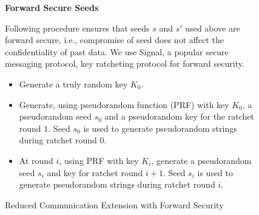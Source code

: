 \begin{figure*}[h]
\begin{mdframed}[style=myframe]
\textbf{Forward Secure Seeds}
\vspace{4pt}

Following procedure ensures that seeds $s$ and $s'$ used above are forward
	secure, i.e., compromise of seed does not affect the confidentiality of past
	data. We use Signal, a popular secure messaging protocol, key ratcheting
	protocol for forward security.

\begin{itemize}[leftmargin=*,itemsep=4pt,topsep=4pt]

	\item Generate a truly random key $K_0$.

	\item Generate, using pseudorandom function (PRF) with key $K_0$, a
		pseudorandom seed $s_0$ and a pseudorandom key for the ratchet round $1$.
		Seed $s_0$ is used to generate pseudorandom strings during ratchet round
		$0$.

	\item At round $i$, using PRF with key $K_i$, generate a pseudorandom seed
		$s_i$ and key for ratchet round $i+1$. Seed $s_i$ is used to generate
		pseudorandom strings during ratchet round $i$.

\end{itemize}

\end{mdframed}
\caption{Reduced Communication Extension with Forward Security}
\label{fig:basicprotocol}
\end{figure*}
